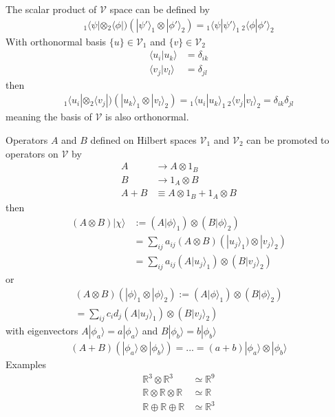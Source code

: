 \documentclass[../main.tex]{subfiles}
\begin{document}
The scalar product of $\mathcal{V}$ space can be defined by
\begin{align}
{}_1\langle\psi|\otimes{}_2\langle\phi|)
(|\psi'\rangle_1\otimes|\phi'\rangle_2)=
{}_1\langle\psi|\psi'\rangle_1\,{}_2\langle\phi|\phi'\rangle_2
\end{align}
With orthonormal basis $\{u\}\in\mathcal{V}_1$ and $\{v\}\in\mathcal{V}_2$
\begin{align}
\langle u_i|u_k\rangle&=\delta_{ik}\\
\langle v_j|v_l\rangle&=\delta_{jl}
\end{align}
then
\begin{align}
{}_1\langle u_i|\otimes{}_2\langle v_j|)
(|u_k\rangle_1\otimes|v_l\rangle_2)=
{}_1\langle u_i|u_k\rangle_1\,{}_2\langle v_j|v_l\rangle_2=\delta_{ik}\delta_{jl}
\end{align}
meaning the basis of $\mathcal{V}$ is also orthonormal.

Operators $A$ and $B$ defined on Hilbert spaces $\mathcal{V}_1$ and $\mathcal{V}_2$ can be promoted to operators on $\mathcal{V}$ by
\begin{align}
A&\rightarrow A\otimes 1_B\\
B&\rightarrow 1_A\otimes B\\
A+B&\equiv A\otimes 1_B + 1_A\otimes B
\end{align}
then
\begin{align}
(A \otimes B)|\chi\rangle 
&:=(A|\phi\rangle_1)\otimes (B|\phi\rangle_2)\\
&=\sum_{ij}a_{ij}(A\otimes B) (|u_j\rangle_1)\otimes |v_j\rangle_2)\\
&=\sum_{ij}a_{ij} (A|u_j\rangle_1)\otimes (B|v_j\rangle_2)
\end{align}
or
\begin{align}
(A \otimes B)(|\phi\rangle_1\otimes|\phi\rangle_2) 
:=(A|\phi\rangle_1)\otimes (B|\phi\rangle_2)\\
=\sum_{ij}c_id_j(A| u_j\rangle_1)\otimes (B|v_j\rangle_2)
\end{align}
with eigenvectors $A|\phi_a\rangle=a|\phi_a\rangle$ and $B|\phi_b\rangle=b|\phi_b\rangle$
\begin{align}
(A + B)(|\phi_a\rangle\otimes|\phi_b\rangle)=...
=(a+b) |\phi_a\rangle\otimes |\phi_b\rangle
\end{align}
Examples
\begin{align}
\mathbb{R}^3\otimes\mathbb{R}^3&\simeq\mathbb{R}^9\\
\mathbb{R}\otimes\mathbb{R}\otimes\mathbb{R}&\simeq\mathbb{R}\\
\mathbb{R}\oplus\mathbb{R}\oplus\mathbb{R}&\simeq\mathbb{R}^3
\end{align}
\end{document}
